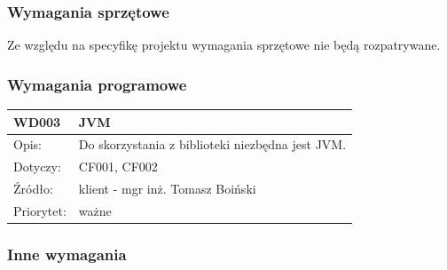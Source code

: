 \subsubsection{Wymagania sprzętowe}


Ze względu na specyfikę projektu wymagania sprzętowe nie będą rozpatrywane.





\subsubsection{Wymagania programowe}


\begin{center}

\begin{tabular}{|m{3cm}|m{9cm}|} \hline

WD003 & JVM \\ \hline
Opis: & Do skorzystania z biblioteki niezbędna jest JVM.\\ \hline
Dotyczy: & CF001, CF002 \\ \hline
Źródło: & klient - mgr inż. Tomasz Boiński \\ \hline
Priorytet: & ważne \\ \hline

\end{tabular}

\end{center}

\subsubsection{Inne wymagania}

